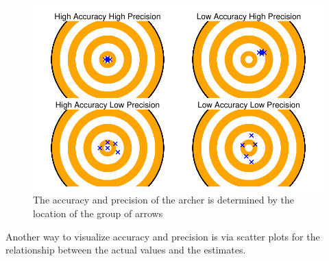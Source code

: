 \documentclass[
  letterpaper,
  DIV=11,
  numbers=noendperiod]{scrreprt}
\begin{document}
\begin{figure}[H]

{\centering \includegraphics{data-accuracy_files/figure-pdf/fig-target-1.pdf}

}

\caption{\label{fig-target}The accuracy and precision of the archer is
determined by the location of the group of arrows}

\end{figure}

Another way to visualize accuracy and precision is via scatter plots for
the relationship between the actual values and the estimates.
\end{document}
